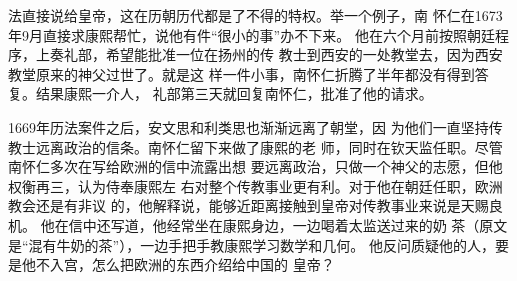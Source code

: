 法直接说给皇帝，这在历朝历代都是了不得的特权。举一个例子，南%
怀仁在1673年9月直接求康熙帮忙，说他有件“很小的事”办不下来。%
他在六个月前按照朝廷程序，上奏礼部，希望能批准一位在扬州的传%
教士到西安的一处教堂去，因为西安教堂原来的神父过世了。就是这%
样一件小事，南怀仁折腾了半年都没有得到答复。结果康熙一介人，%
礼部第三天就回复南怀仁，批准了他的请求。%
\par
1669年历法案件之后，安文思和利类思也渐渐远离了朝堂，因%
为他们一直坚持传教士远离政治的信条。南怀仁留下来做了康熙的老%
师，同时在钦天监任职。尽管南怀仁多次在写给欧洲的信中流露出想%
要远离政治，只做一个神父的志愿，但他权衡再三，认为侍奉康熙左%
右对整个传教事业更有利。对于他在朝廷任职，欧洲教会还是有非议%
的，他解释说，能够近距离接触到皇帝对传教事业来说是天赐良机。%
他在信中还写道，他经常坐在康熙身边，一边喝着太监送过来的奶%
茶（原文是“混有牛奶的茶”），一边手把手教康熙学习数学和几何。%
他反问质疑他的人，要是他不入宫，怎么把欧洲的东西介绍给中国的%
皇帝？%
